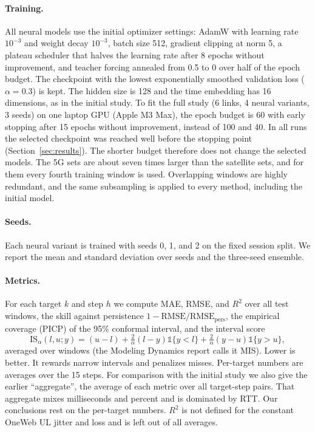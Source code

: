 \paragraph{Training.} All neural models use the initial optimizer settings: AdamW with learning rate $10^{-3}$ and weight decay $10^{-3}$, batch size 512, gradient clipping at norm 5, a plateau scheduler that halves the learning rate after 8 epochs without improvement, and teacher forcing annealed from 0.5 to 0 over half of the epoch budget. The checkpoint with the lowest exponentially smoothed validation loss ($\alpha=0.3$) is kept. The hidden size is 128 and the time embedding has 16 dimensions, as in the initial study. To fit the full study (6 links, 4 neural variants, 3 seeds) on one laptop GPU (Apple M3 Max), the epoch budget is 60 with early stopping after 15 epochs without improvement, instead of 100 and 40. In all runs the selected checkpoint was reached well before the stopping point (Section~\ref{sec:results}). The shorter budget therefore does not change the selected models. The 5G sets are about seven times larger than the satellite sets, and for them every fourth training window is used. Overlapping windows are highly redundant, and the same subsampling is applied to every method, including the initial model.

\paragraph{Seeds.} Each neural variant is trained with seeds 0, 1, and 2 on the fixed session split. We report the mean and standard deviation over seeds and the three-seed ensemble.

\paragraph{Metrics.} For each target $k$ and step $h$ we compute MAE, RMSE, and $R^2$ over all test windows, the skill against persistence $1-\mathrm{RMSE}/\mathrm{RMSE}_{\text{pers}}$, the empirical coverage (PICP) of the 95\% conformal interval, and the interval score~\cite{gneiting2007strictly}
\begin{equation}
\mathrm{IS}_\alpha(l,u;y)=(u-l)+\tfrac{2}{\alpha}(l-y)\mathbb{1}\{y<l\}+\tfrac{2}{\alpha}(y-u)\mathbb{1}\{y>u\},
\end{equation}
averaged over windows (the Modeling Dynamics report calls it MIS). Lower is better. It rewards narrow intervals and penalizes misses. Per-target numbers are averages over the 15 steps. For comparison with the initial study we also give the earlier ``aggregate'', the average of each metric over all target-step pairs. That aggregate mixes milliseconds and percent and is dominated by RTT. Our conclusions rest on the per-target numbers. $R^2$ is not defined for the constant OneWeb UL jitter and loss and is left out of all averages.

